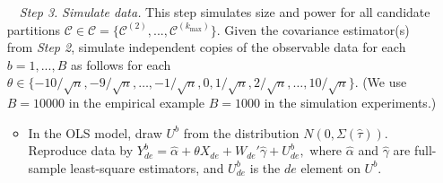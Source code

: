 \documentclass[preprint]{imsart}
\numberwithin{equation}{section}
\theoremstyle{plain}
\theoremstyle{definition}
\renewcommand{\(}{\left(}
\renewcommand{\)}{\right)}
\renewcommand{\[}{\left[}
\renewcommand{\]}{\right]}
\newcommand{\G}{k}
\renewcommand{\diamond}{b}
\begin{document}
{\begin{enumerate}
\begin{itemize}
		\item In the IV model, the covariance matrices for the structural and first-stage equations are estimated separately. 
		Let $\widehat{U}=M_WY-M_WX\widehat{\theta}$ and $\widehat{V}=M_WX-M_WZ\widehat{\pi}$, where $\widehat{\theta}$ is the 2SLS estimator for $\theta_0$ and $\widehat{\pi}$ is the least-square estimator for $\pi$. 
		Then, the covariance matrices for $U$ and $V$ are estimated by solving
		$$\widehat{\tau}^\varepsilon=\underset{\tau}{\arg\max}\left\lbrace \frac{1}{2}\log \det (\Sigma_{PM\varepsilon}(\tau) )+\frac{1}{2}\widehat{\varepsilon}'P_{M_W}'(\Sigma_{PM\varepsilon}(\tau) )^{-1}P_{M_W}\widehat{\varepsilon}\right\rbrace ,$$
		where $\Sigma_{PM\varepsilon}=P_{M_W}M_W\Sigma(\tau)M_WP_{M_W}'$, $\Sigma(\tau)=(\Sigma_{de,d'e'}(\tau))_{de,d'e'}$, $  \Sigma_{de,d'e'}(\tau)$ is as previously defined, and $\varepsilon$ is either $U$ or $V$. 
		Then, the covariance estimators for $U$ and $V$ are $\widehat{\Sigma}_U =  \Sigma(\widehat{\tau}^U)$ and $\widehat{\Sigma}_V = \Sigma(\widehat{\tau}^V)$, respectively. Finally, estimate the correlation between first and second stage errors with $\widehat{\rho}$, the empirical correlation between $\widehat{\Sigma}_U^{-1/2}\widehat{U}$ and $\widehat{\Sigma}_V^{-1/2}\widehat{V}$.
	\end{itemize}
	\item[ \ \ \textit{Step 3.}] \textit{Simulate data.} This step simulates size and power for all candidate partitions $\mathcal C \in \mathscr C = \{ \mathcal C^{(2)},...,\mathcal C^{(\G_{\mathrm{max}})}\}$. Given the covariance estimator(s) from \textit{Step 2}, simulate independent copies of the observable data for each $\diamond=1,...,B$ as follows for each $\theta\in \{-10/\sqrt{n},-9/\sqrt{n},\dots,-1/\sqrt{n},0,1/\sqrt{n},2/\sqrt{n},\dots,10/\sqrt{n} \}$. (We use $B = 10000$ in the empirical example $B = 1000$ in the simulation experiments.)
	\begin{itemize}
		\item In the OLS model, draw $U^\diamond$ from the distribution $N(0,\Sigma(\widehat{\tau})) $. 
		Reproduce data by  $Y_{de}^\diamond=\widehat{\alpha}+\theta X_{de}+W_{de}'\widehat{\gamma}+U_{de}^\diamond,$
		where $\widehat{\alpha}$ and $\widehat{\gamma}$ are full-sample least-square estimators, and $U_{de}^\diamond$ is the $de$ element on $U^\diamond$. 
				

\end{itemize}
\end{enumerate}}
\end{document}
